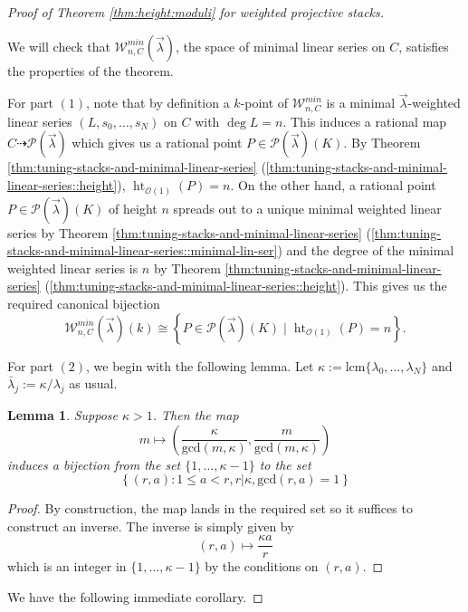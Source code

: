 \documentclass[a4paper,12pt]{amsart}
\newtheorem{lem}[thm]{Lemma}
\theoremstyle{definition}
\newcommand{\cO}{\mathcal{O}}
\newcommand{\cW}{\mathcal{W}}
\DeclareMathOperator{\height}{ht}
\newcommand{\Pcv}{\mathcal{P}(\vec{\lambda})}
\newcommand{\lambdavec}{{\vec{\lambda}}}
\begin{document}
	
	\begin{proof}[{Proof of Theorem \ref{thm:height:moduli} for weighted projective stacks}]\label{proof:wps}
		
		We will check that $\cW^{min}_{n,C}(\lambdavec)$, the space of minimal linear series on $C$, satisfies the properties of the theorem. 
		
		For part $(1)$, note that by definition a $k$-point of $\cW^{min}_{n,C}$ is a minimal $\lambdavec$-weighted linear series $(L, s_0, \ldots, s_N)$ on $C$ with $\deg L = n$. This induces a rational map $C \dashrightarrow \Pcv$ which gives us a rational point $P \in \Pcv(K)$. By Theorem \ref{thm:tuning-stacks-and-minimal-linear-series} (\ref{thm:tuning-stacks-and-minimal-linear-series::height}), $\height_{\cO(1)}(P) = n$. On the other hand, a rational point $P \in \Pcv(K)$ of height $n$ spreads out to a unique minimal weighted linear series by Theorem \ref{thm:tuning-stacks-and-minimal-linear-series} (\ref{thm:tuning-stacks-and-minimal-linear-series::minimal-lin-ser}) and the degree of the minimal weighted linear series is $n$ by Theorem \ref{thm:tuning-stacks-and-minimal-linear-series} (\ref{thm:tuning-stacks-and-minimal-linear-series::height}). This gives us the required canonical bijection
		$$
		\cW_{n,C}^{min}(\lambdavec)(k) \cong \left\{P \in \Pcv(K) \mid \height_{\cO(1)}(P) = n\right\}. 
		$$
		
		For part $(2)$, we begin with the following lemma. Let $\kappa := \mathrm{lcm}\{\lambda_0, \ldots, \lambda_N\}$ and $\bar{\lambda}_j := \kappa/\lambda_j$ as usual. 
		
		\begin{lem}\label{lem:bijection} Suppose $\kappa > 1$. Then the map 
			$$
			m \mapsto \left( \frac{\kappa}{\mathrm{gcd}(m,\kappa)}, \frac{m}{\mathrm{gcd}(m,\kappa)}\right)
			$$
			induces a bijection from the set $\{1,\ldots, \kappa - 1\}$ to the set 
			$$
			\left\{(r,a) : 1 \le a < r, r|\kappa, \mathrm{gcd}(r,a) = 1\right\}
			$$
			
		\end{lem}
		\begin{proof} 
			By construction, the map lands in the required set so it suffices to construct an inverse. The inverse is simply given by
			$$
			(r,a) \mapsto \frac{\kappa a}{r}
			$$
			which is an integer in $\{1, \ldots, \kappa - 1\}$ by the conditions on $(r,a)$.
		\end{proof}
		
		We have the following immediate corollary. 
		

\end{proof}
\end{document}
